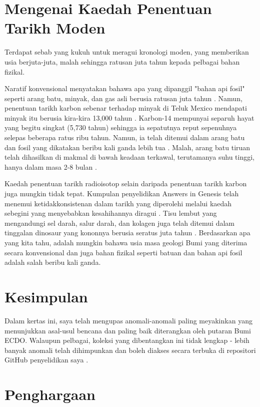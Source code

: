 \documentclass[10pt,twocolumn,letterpaper]{article}
\begin{document}
\section{Mengenai Kaedah Penentuan Tarikh Moden}

Terdapat sebab yang kukuh untuk meragui kronologi moden, yang memberikan usia berjuta-juta, malah sehingga ratusan juta tahun kepada pelbagai bahan fizikal.

Naratif konvensional menyatakan bahawa apa yang dipanggil "bahan api fosil" seperti arang batu, minyak, dan gas asli berusia ratusan juta tahun \cite{104}. Namun, penentuan tarikh karbon sebenar terhadap minyak di Teluk Mexico mendapati minyak itu berusia kira-kira 13,000 tahun \cite{105}. Karbon-14 mempunyai separuh hayat yang begitu singkat (5,730 tahun) sehingga ia sepatutnya reput sepenuhnya selepas beberapa ratus ribu tahun. Namun, ia telah ditemui dalam arang batu dan fosil yang dikatakan beribu kali ganda lebih tua \cite{106}. Malah, arang batu tiruan telah dihasilkan di makmal di bawah keadaan terkawal, terutamanya suhu tinggi, hanya dalam masa 2-8 bulan \cite{107}.

Kaedah penentuan tarikh radioisotop selain daripada penentuan tarikh karbon juga mungkin tidak tepat. Kumpulan penyelidikan Answers in Genesis telah menemui ketidakkonsistenan dalam tarikh yang diperolehi melalui kaedah sebegini yang menyebabkan kesahihannya diragui \cite{108}. Tisu lembut yang mengandungi sel darah, salur darah, dan kolagen juga telah ditemui dalam tinggalan dinosaur yang kononnya berusia seratus juta tahun \cite{109,110}. Berdasarkan apa yang kita tahu, adalah mungkin bahawa usia masa geologi Bumi yang diterima secara konvensional dan juga bahan fizikal seperti batuan dan bahan api fosil adalah salah beribu kali ganda.

\section{Kesimpulan}

Dalam kertas ini, saya telah mengupas anomali-anomali paling meyakinkan yang menunjukkan asal-usul bencana dan paling baik diterangkan oleh putaran Bumi ECDO. Walaupun pelbagai, koleksi yang dibentangkan ini tidak lengkap - lebih banyak anomali telah dihimpunkan dan boleh diakses secara terbuka di repositori GitHub penyelidikan saya \cite{2}.
\section{Penghargaan}
\end{document}
